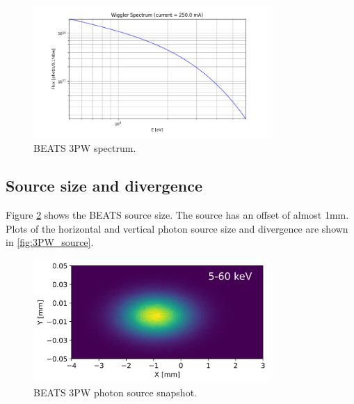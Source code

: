 \begin{figure}[ht]
\centering
\includegraphics[width=0.8\textwidth]{./../../beam_snapshots/3PW/wiggler_spectrum.png}
\caption{\label{fig:flux} BEATS 3PW spectrum.}
\end{figure}

\subsection{Source size and divergence}
Figure \ref{fig:snapshot_3PW} shows the BEATS source size. The source has an offset of almost 1mm. Plots of the horizontal and vertical photon source size and divergence are shown in \ref{fig:3PW_source}.\\

\begin{figure}[ht]
\centering
\includegraphics[width=0.8\textwidth]{./../../beam_snapshots/3PW/source_snapshot_5-60keV.png}
\caption{\label{fig:snapshot_3PW} BEATS 3PW photon source snapshot.}
\end{figure}

